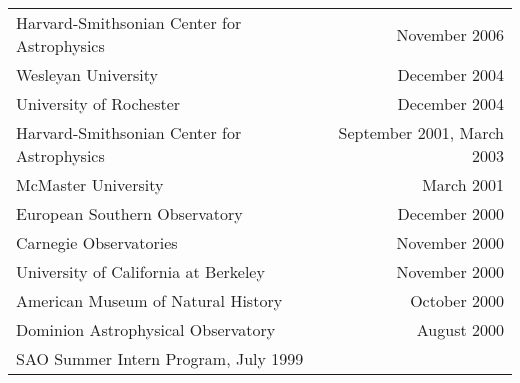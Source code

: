 \documentclass[12pt]{article}
\begin{document}
\begin{tabularx}{\textwidth}{Xr}
Harvard-Smithsonian Center for Astrophysics& November 2006\\
Wesleyan University& December 2004\\
University of Rochester& December 2004\\
Harvard-Smithsonian Center for Astrophysics& September 2001, March 2003\\
McMaster University& March 2001\\
European Southern Observatory& December 2000\\
Carnegie Observatories& November 2000\\
University of California at Berkeley& November 2000\\
American Museum of Natural History& October 2000\\
Dominion Astrophysical Observatory& August 2000\\
SAO Summer Intern Program, July 1999 %
\end{tabularx}

\clearpage

\begin{publications}

\printbibliography[title={Submitted refereed publications},keyword=submit]

\printbibliography[title={Refereed publications},keyword=ref]

\setcounter{papers}{0}
\printbibliography[title={Conference presentations},keyword=unref]


\end{publications}
\end{document}
